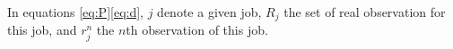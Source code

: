 \documentclass[10pt,conference,compsocconf]{IEEEtran}
\begin{document}
In equations \eqref{eq:P}\eqref{eq:d}, $j$ denote a given job, $R_j$ the set of real
observation for this job, and $r_j^n$ the $n$th observation of this job.

\end{document}
